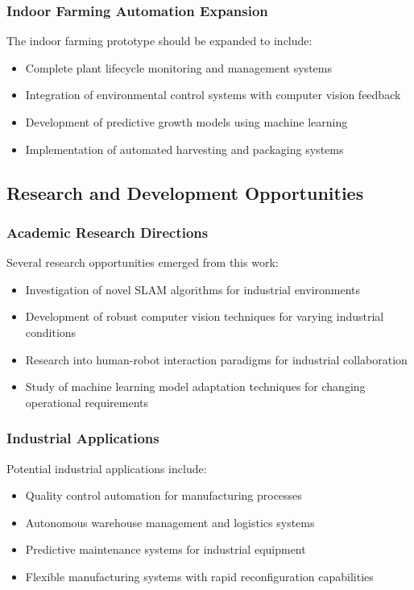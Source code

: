 \documentclass{book}
\begin{document}
\subsubsection{Indoor Farming Automation Expansion}
\par\noindent The indoor farming prototype should be expanded to include:

\begin{itemize}
\item Complete plant lifecycle monitoring and management systems
\item Integration of environmental control systems with computer vision feedback
\item Development of predictive growth models using machine learning
\item Implementation of automated harvesting and packaging systems
\end{itemize}

\subsection{Research and Development Opportunities}

\subsubsection{Academic Research Directions}
\par\noindent Several research opportunities emerged from this work:

\begin{itemize}
\item Investigation of novel SLAM algorithms for industrial environments
\item Development of robust computer vision techniques for varying industrial conditions
\item Research into human-robot interaction paradigms for industrial collaboration
\item Study of machine learning model adaptation techniques for changing operational requirements
\end{itemize}

\subsubsection{Industrial Applications}
\par\noindent Potential industrial applications include:

\begin{itemize}
\item Quality control automation for manufacturing processes
\item Autonomous warehouse management and logistics systems
\item Predictive maintenance systems for industrial equipment
\item Flexible manufacturing systems with rapid reconfiguration capabilities
\end{itemize}
\end{document}
